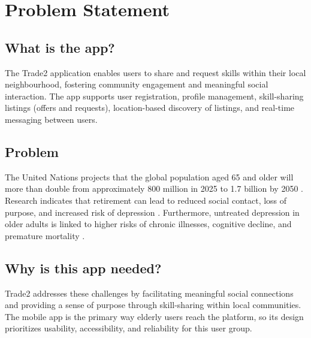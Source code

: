 \section{Problem Statement}\label{sec:hd-problem-statement}

\subsection{What is the app?}\label{sec:hd-what-is-the-app}
The Trade2 application enables users to share and request skills within their local neighbourhood, fostering community engagement and meaningful social interaction.
The app supports user registration, profile management, skill-sharing listings (offers and requests), location-based discovery of listings, and real-time messaging between users.

\subsection{Problem}\label{sec:hd-problem}
The United Nations projects that the global population aged 65 and older will more than double from approximately 800 million in 2025 to 1.7 billion by 2050 \cite{un-population}.
Research indicates that retirement can lead to reduced social contact, loss of purpose, and increased risk of depression \cite{who2023, dang2023}.
Furthermore, untreated depression in older adults is linked to higher risks of chronic illnesses, cognitive decline, and premature mortality \cite{chapman2004}.

\subsection{Why is this app needed?}\label{sec:hd-why-needed}
Trade2 addresses these challenges by facilitating meaningful social connections and providing a sense of purpose through skill-sharing within local communities.
The mobile app is the primary way elderly users reach the platform, so its design prioritizes usability, accessibility, and reliability for this user group.
